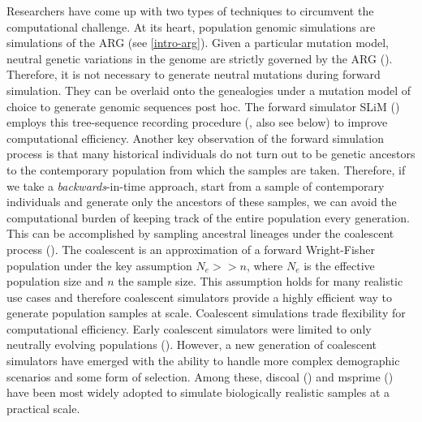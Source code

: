 Researchers have come up with two types of techniques to circumvent the computational challenge. At its heart, population genomic simulations are simulations of the \ac{ARG} (see \ref{intro-arg}). Given a particular mutation model, neutral genetic variations in the genome are strictly governed by the \ac{ARG} (\cite{wakeley2005coalescent,hahn2018molecular}). Therefore, it is not necessary to generate neutral mutations during forward simulation. They can be overlaid onto the genealogies under a mutation model of choice to generate genomic sequences post hoc. The forward simulator SLiM (\cite{haller_slim_2019}) employs this tree-sequence recording procedure (\cite{haller_tree-sequence_2019}, also see below) to improve computational efficiency. Another key observation of the forward simulation process is that many historical individuals do not turn out to be genetic ancestors to the contemporary population from which the samples are taken. Therefore, if we take a \textit{backwards}-in-time approach, start from a sample of contemporary individuals and generate only the ancestors of these samples, we can avoid the computational burden of keeping track of the entire population every generation. This can be accomplished by sampling ancestral lineages under the coalescent process (\cite{kingman1982coalescent,kingman1982genealogy,hudson_gene_1990,tajima1983evolutionary}). The coalescent is an approximation of a forward Wright-Fisher population under the key assumption $N_e >> n$, where $N_e$ is the effective population size and $n$ the sample size. This assumption holds for many realistic use cases and therefore coalescent simulators provide a highly efficient way to generate population samples at scale. Coalescent simulations trade flexibility for computational efficiency. Early coalescent simulators were limited to only neutrally evolving populations (\cite{hahn2018molecular,lewanski2023era}). However, a new generation of coalescent simulators have emerged with the ability to handle more complex demographic scenarios and some form of selection. Among these, discoal (\cite{kern_discoal_2016}) and msprime (\cite{kelleher2016efficient}) have been most widely adopted to simulate biologically realistic samples at a practical scale.

